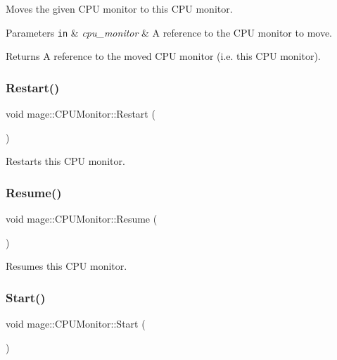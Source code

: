 Moves the given C\+PU monitor to this C\+PU monitor.


\begin{DoxyParams}[1]{Parameters}
\mbox{\tt in}  & {\em cpu\+\_\+monitor} & A reference to the C\+PU monitor to move. \\
\hline
\end{DoxyParams}
\begin{DoxyReturn}{Returns}
A reference to the moved C\+PU monitor (i.\+e. this C\+PU monitor). 
\end{DoxyReturn}
\hypertarget{classmage_1_1_c_p_u_monitor_a747df3f9e2903a5ade4a0d6ad2a65a05}{}\label{classmage_1_1_c_p_u_monitor_a747df3f9e2903a5ade4a0d6ad2a65a05} 
\subsubsection{\texorpdfstring{Restart()}{Restart()}}
{\footnotesize\ttfamily void mage\+::\+C\+P\+U\+Monitor\+::\+Restart (\begin{DoxyParamCaption}{ }\end{DoxyParamCaption})}

Restarts this C\+PU monitor. \hypertarget{classmage_1_1_c_p_u_monitor_a2821cbe7bd550d42c35a26c72f956f08}{}\label{classmage_1_1_c_p_u_monitor_a2821cbe7bd550d42c35a26c72f956f08} 
\subsubsection{\texorpdfstring{Resume()}{Resume()}}
{\footnotesize\ttfamily void mage\+::\+C\+P\+U\+Monitor\+::\+Resume (\begin{DoxyParamCaption}{ }\end{DoxyParamCaption})}

Resumes this C\+PU monitor. \hypertarget{classmage_1_1_c_p_u_monitor_af41d32ea2f96206f0bb963893464d3c4}{}\label{classmage_1_1_c_p_u_monitor_af41d32ea2f96206f0bb963893464d3c4} 
\subsubsection{\texorpdfstring{Start()}{Start()}}
{\footnotesize\ttfamily void mage\+::\+C\+P\+U\+Monitor\+::\+Start (\begin{DoxyParamCaption}{ }\end{DoxyParamCaption})}

